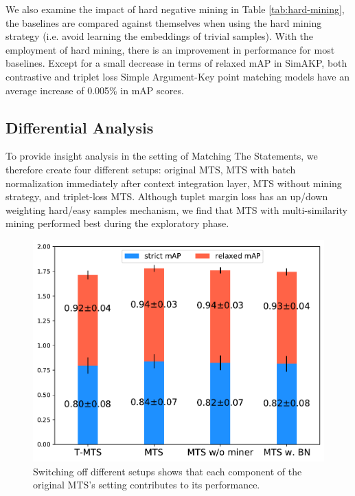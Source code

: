 We also examine the impact of hard negative mining in Table \ref{tab:hard-mining}, the baselines are compared against themselves when using the hard mining strategy (i.e. avoid learning the embeddings of trivial samples). With the employment of hard mining, there is an improvement in performance for most baselines. Except for a small decrease in terms of relaxed mAP in SimAKP, both contrastive and triplet loss Simple Argument-Key point matching models have an average increase of 0.005\% in mAP scores.

\subsection{Differential Analysis}
To provide insight analysis in the setting of Matching The Statements, we therefore create four different setups: original MTS, MTS with batch normalization \citep{ioffe2015batch} immediately after context integration layer, MTS without mining strategy, and triplet-loss MTS. Although tuplet margin loss has an up/down weighting hard/easy samples mechanism, we find that MTS with multi-similarity mining \citep{wang2019multi} performed best during the exploratory phase. 

\begin{figure}[h]
\centering
\includegraphics[scale=0.44]{figures/modification.pdf}
\caption{Switching off different setups shows that each component of the original MTS's setting contributes to its performance.}
\label{fig:modification}
\end{figure}

